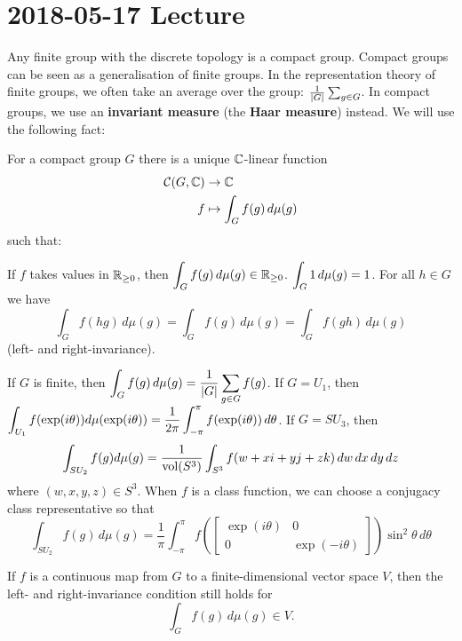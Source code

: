 \section{2018-05-17 Lecture}

Any finite group with the discrete topology is a compact group.
Compact groups can be seen as a generalisation of finite groups.
In the representation theory of finite groups, we often take an average over the group: $\frac{1}{\left\lvert G \right\rvert}\sum_{g \in G}$.
In compact groups, we use an \textbf{invariant measure} (the \textbf{Haar measure}) instead.
We will use the following fact:

\begin{thm}
  For a compact group $G$ there is a unique $\mathbb{C}$-linear function
  \begin{align*}
    \mathcal{C}(G,\mathbb{C}) &\to \mathbb{C} \\
    f &\mapsto \int_G f(g) \, d\mu(g)
  \end{align*}
  such that:
  \begin{enum}
    \io If $f$ takes values in $\mathbb{R}_{\geq 0}$, then $\displaystyle \int_G f(g) \, d\mu(g) \in \mathbb{R}_{\geq 0}$.
    \io $\displaystyle \int_G 1 \, d\mu(g) = 1$.
    \io For all $h \in G$ we have
    \[ \int_G f(hg) \, d\mu(g) = \int_G f(g) \, d\mu(g) = \int_G f(gh) \, d\mu(g) \]
    (left- and right-invariance).
  \end{enum}
\end{thm}

\begin{exam}
  \lv
  \begin{enum}
    \io If $G$ is finite, then $\displaystyle \int_G f(g) \, d\mu(g) = \frac{1}{\left\lvert G \right\rvert} \sum_{g \in G} f(g)$.
    \io If $G=U_1$, then $\displaystyle \int_{U_1} f(\exp(i\theta)) d\mu(\exp(i\theta)) = \frac{1}{2\pi} \int_{-\pi}^\pi f(\exp(i\theta)) \, d\theta$.
    \io If $G=SU_3$, then
    \[ \int_{SU_2} f(g) d\mu(g) = \frac{1}{\operatorname{vol}(S^3)} \int_{S^3} f(w+xi+yj+zk) \, dw \, dx \, dy \, dz \]
    where $(w,x,y,z) \in S^3$.
    When $f$ is a class function, we can choose a conjugacy class representative so that
    \[ \int_{SU_2} f(g) \, d\mu(g) = \frac 1\pi \int_{-\pi}^\pi f \left( 
	\begin{bmatrix}
	  \exp(i\theta) & 0 \\ 0 & \exp(-i\theta)
	\end{bmatrix}
    \right) \sin^2\theta \, d\theta \]
  \end{enum}
\end{exam}

\begin{rmk}
  If $f$ is a continuous map from $G$ to a finite-dimensional vector space $V$, then the left- and right-invariance condition still holds for
  \[ \int_G f(g) \, d\mu(g) \in V. \]
\end{rmk}

